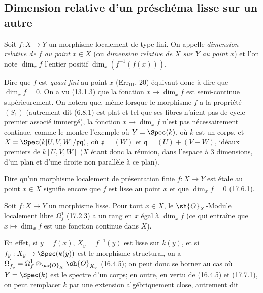 \subsection{Dimension relative d'un préschéma lisse sur un autre}
\label{subsection:IV.17.10}

\begin{definition}[17.10.1]
\label{IV.17.10.1}
Soit $f:X\to Y$ un morphisme localement de type fini. On appelle \emph{dimension relative de $f$ au point $x\in X$} (ou \emph{dimension relative de $X$ sur $Y$ au point $x$}) et l'on note $\dim_x f$ l'entier positif $\dim_x(f^{-1}(f(x)))$.
\end{definition}

Dire que $f$ est \emph{quasi-fini} au point $x$ (Err$_{\mathrm{III}}$, 20) équivaut donc à dire que $\dim_x f=0$. On a vu (13.1.3) que la fonction $x\mapsto\dim_x f$ est semi-continue supérieurement. On notera que, même lorsque le morphisme $f$ a la propriété $(S_1)$ (autrement dit (6.8.1) est plat et tel que ses fibres n'aient pas de cycle premier associé immergé), la fonction $x\mapsto\dim_x f$ n'est pas nécessairement continue, comme le montre l'exemple où $Y=\Spec(k)$, où $k$ est un corps, et $X=\Spec(k[U,V,W]/\mathfrak p\mathfrak q)$, où $\mathfrak p=(W)$ et $\mathfrak q=(U)+(V-W)$, idéaux premiers de $k[U,V,W]$ ($X$ étant donc la réunion, dans l'espace à 3 dimensions, d'un plan et d'une droite non parallèle à ce plan).

Dire qu'un morphisme localement de présentation finie $f:X\to Y$ est étale au point $x\in X$ signifie encore que $f$ est lisse au point $x$ et que $\dim_x f=0$ (17.6.1).

\begin{proposition}[17.10.2]
\label{IV.17.10.2}
Soit $f:X\to Y$ un morphisme lisse. Pour tout $x\in X$, le $\sh{O}_X$-Module localement libre $\Omega_f^1$ (17.2.3) a un rang en $x$ égal à $\dim_x f$ (ce qui entraîne que $x\mapsto\dim_x f$ est une fonction continue dans $X$).
\end{proposition}

En effet, si $y=f(x)$, $X_y=f^{-1}(y)$ est lisse sur $k(y)$, et si $f_y:X_y\to\Spec(k(y))$ est le morphisme structural, on a $\Omega_{f_y}^1=\Omega_f^1\otimes_{\sh{O}_X}\sh{O}_{X_y}$ (16.4.5); on peut donc se borner au cas où $Y=\Spec(k)$ est le spectre d'un corps; en outre, en vertu de (16.4.5) et (17.7.1), on peut remplacer $k$ par une extension algébriquement close, autrement dit


